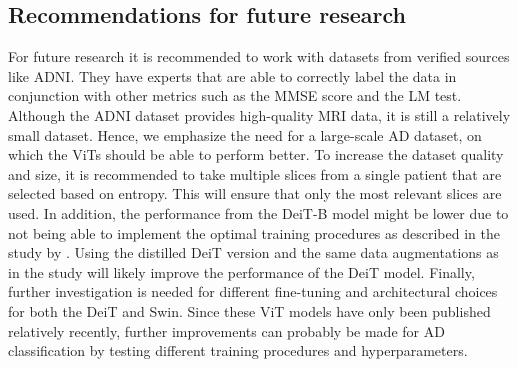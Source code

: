 \documentclass[11pt, a4paper]{article}
\begin{document}
\subsection{Recommendations for future research} \label{subs:future}
For future research it is recommended to work with datasets from verified sources like ADNI. They have experts that are able to correctly label the data in conjunction with other metrics such as the MMSE score and the LM test. Although the ADNI dataset provides high-quality MRI data, it is still a relatively small dataset. Hence, we emphasize the need for a large-scale AD dataset, on which the ViTs should be able to perform better. To increase the dataset quality and size, it is recommended to take multiple slices from a single patient that are selected based on entropy. This will ensure that only the most relevant slices are used. In addition, the performance from the DeiT-B model might be lower due to not being able to implement the optimal training procedures as described in the study by \cite{Touvron2021TrainingAttention}. Using the distilled DeiT version and the same data augmentations as in the study will likely improve the performance of the DeiT model. Finally, further investigation is needed for different fine-tuning and architectural choices for both the DeiT and Swin. Since these ViT models have only been published relatively recently, further improvements can probably be made for AD classification by testing different training procedures and hyperparameters. 

\newpage
\end{document}
